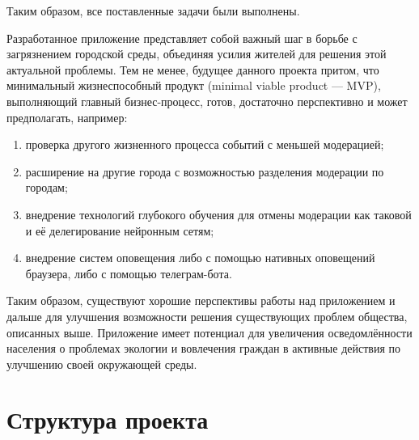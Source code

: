 \documentclass[diploma]{SCWorks}
\begin{document}
Таким образом, все поставленные задачи были выполнены.

Разработанное приложение представляет собой важный шаг в борьбе 
с загрязнением городской среды, объединяя усилия жителей для решения этой 
актуальной проблемы. Тем не менее, будущее данного проекта притом, что 
минимальный жизнеспособный продукт (minimal viable product — MVP), 
выполняющий главный бизнес-процесс, готов, достаточно перспективно и может 
предполагать, например:
\begin{enumerate}
    \item проверка другого жизненного процесса событий с меньшей модерацией;
    \item расширение на другие города с возможностью разделения модерации по 
    городам;
    \item внедрение технологий глубокого обучения для отмены модерации как 
    таковой и её делегирование нейронным сетям;
    \item внедрение систем оповещения либо с помощью нативных оповещений 
    браузера, либо с помощью телеграм-бота.
\end{enumerate}

Таким образом, существуют хорошие перспективы работы над приложением и 
дальше для улучшения возможности решения существующих проблем общества, 
описанных выше. Приложение имеет потенциал для увеличения осведомлённости 
населения о проблемах экологии и вовлечения граждан в активные действия по 
улучшению своей окружающей среды.

\nocite{*}




\appendix

\section{Структура проекта}
\label{appendA}

\end{document}
